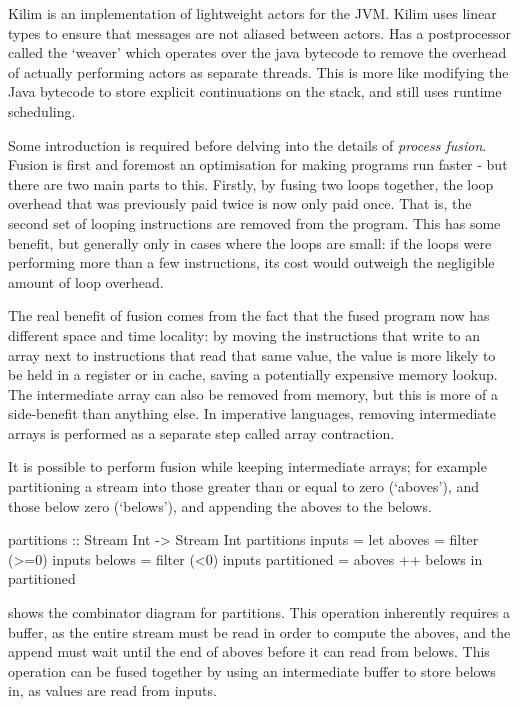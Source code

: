 Kilim \cite{srinivasan2010kilim} is an implementation of lightweight actors for the JVM.
Kilim uses linear types to ensure that messages are not aliased between actors.
Has a postprocessor called the `weaver' which operates over the java bytecode to remove the overhead of actually performing actors as separate threads.
This is more like modifying the Java bytecode to store explicit continuations on the stack, and still uses runtime scheduling.



Some introduction is required before delving into the details of \emph{process fusion}.
Fusion is first and foremost an optimisation for making programs run faster - but there are two main parts to this.
Firstly, by fusing two loops together, the loop overhead that was previously paid twice is now only paid once.
That is, the second set of looping instructions are removed from the program.
This has some benefit, but generally only in cases where the loops are small: if the loops were performing more than a few instructions, its cost would outweigh the negligible amount of loop overhead.

The real benefit of fusion comes from the fact that the fused program now has different space and time locality: by moving the instructions that write to an array next to instructions that read that same value, the value is more likely to be held in a register or in cache, saving a potentially expensive memory lookup.
The intermediate array can also be removed from memory, but this is more of a side-benefit than anything else.
In imperative languages, removing intermediate arrays is performed as a separate step called array contraction.

It is possible to perform fusion while keeping intermediate arrays; for example partitioning a stream into those greater than or equal to zero (`aboves'), and those below zero (`belows'), and appending the aboves to the belows.

\begin{code}
partitions :: Stream Int -> Stream Int
partitions inputs =
 let aboves      = filter (>=0) inputs
     belows      = filter  (<0) inputs
     partitioned = aboves ++ belows
 in  partitioned
\end{code}


 shows the combinator diagram for partitions.
This operation inherently requires a buffer, as the entire stream must be read in order to compute the aboves, and the append must wait until the end of aboves before it can read from belows.
This operation can be fused together by using an intermediate buffer to store belows in, as values are read from inputs.

